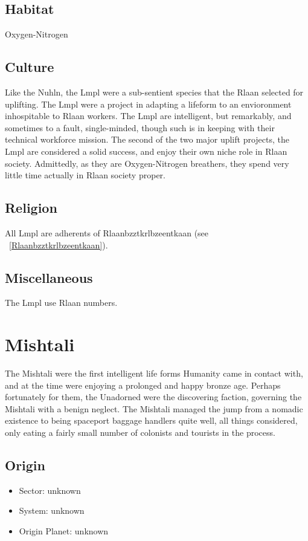 \subsection{Habitat}
Oxygen-Nitrogen 

\subsection{Culture}
Like the Nuhln, the Lmpl were a sub-sentient species that the Rlaan
selected for uplifting. The Lmpl were a project in adapting a lifeform
to an envioronment inhospitable to Rlaan workers. The Lmpl are
intelligent, but remarkably, and sometimes to a fault, single-minded,
though such is in keeping with their technical workforce mission. The
second of the two major uplift projects, the Lmpl are considered a
solid success, and enjoy their own niche role in Rlaan
society. Admittedly, as they are Oxygen-Nitrogen breathers, they spend
very little time actually in Rlaan society proper.

\subsection{Religion}
All Lmpl are adherents of Rlaanbzztkrlbzeentkaan (see ~\ref{Rlaanbzztkrlbzeentkaan}). 

\subsection{Miscellaneous}
The Lmpl use Rlaan numbers. 

\section{Mishtali}

The Mishtali were the first intelligent life forms Humanity came in
contact with, and at the time were enjoying a prolonged and happy
bronze age. Perhaps fortunately for them, the Unadorned were the
discovering faction, governing the Mishtali with a benign neglect. The
Mishtali managed the jump from a nomadic existence to being spaceport
baggage handlers quite well, all things considered, only eating a
fairly small number of colonists and tourists in the process.

\subsection{Origin}
\begin{itemize}
\item Sector: unknown
\item System: unknown
\item Origin Planet: unknown
\end{itemize}

